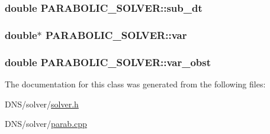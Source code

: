 \subsubsection[{\texorpdfstring{sub\+\_\+dt}{sub_dt}}]{\setlength{\rightskip}{0pt plus 5cm}double P\+A\+R\+A\+B\+O\+L\+I\+C\+\_\+\+S\+O\+L\+V\+E\+R\+::sub\+\_\+dt}\hypertarget{class_p_a_r_a_b_o_l_i_c___s_o_l_v_e_r_a0de489f53fefae341770af1a384d32a0}{}\label{class_p_a_r_a_b_o_l_i_c___s_o_l_v_e_r_a0de489f53fefae341770af1a384d32a0}
\subsubsection[{\texorpdfstring{var}{var}}]{\setlength{\rightskip}{0pt plus 5cm}double$\ast$ P\+A\+R\+A\+B\+O\+L\+I\+C\+\_\+\+S\+O\+L\+V\+E\+R\+::var}\hypertarget{class_p_a_r_a_b_o_l_i_c___s_o_l_v_e_r_afba149cd7f4788988a0d679bd64674f2}{}\label{class_p_a_r_a_b_o_l_i_c___s_o_l_v_e_r_afba149cd7f4788988a0d679bd64674f2}
\subsubsection[{\texorpdfstring{var\+\_\+obst}{var_obst}}]{\setlength{\rightskip}{0pt plus 5cm}double P\+A\+R\+A\+B\+O\+L\+I\+C\+\_\+\+S\+O\+L\+V\+E\+R\+::var\+\_\+obst}\hypertarget{class_p_a_r_a_b_o_l_i_c___s_o_l_v_e_r_adf19b5ca7b5a3e62159d9cbc7b3e5396}{}\label{class_p_a_r_a_b_o_l_i_c___s_o_l_v_e_r_adf19b5ca7b5a3e62159d9cbc7b3e5396}


The documentation for this class was generated from the following files\+:\begin{DoxyCompactItemize}
\item 
D\+N\+S/solver/\hyperlink{solver_8h}{solver.\+h}\item 
D\+N\+S/solver/\hyperlink{parab_8cpp}{parab.\+cpp}\end{DoxyCompactItemize}
